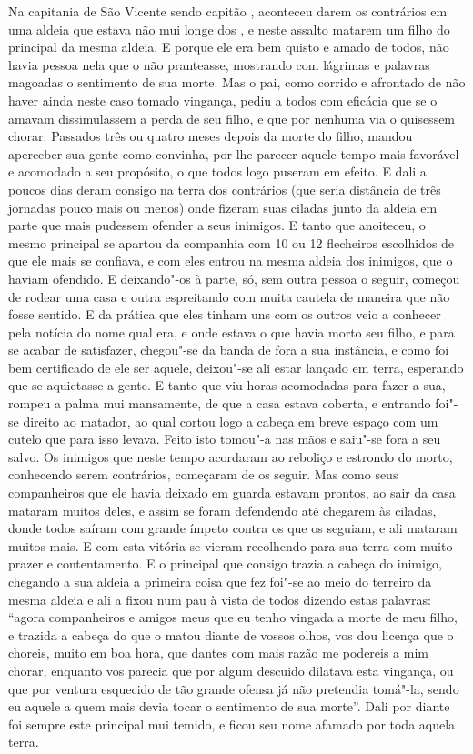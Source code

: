 Na capitania de São Vicente sendo capitão , aconteceu darem		%
os contrários em uma aldeia que estava não mui longe dos , e
neste assalto matarem um filho do principal da mesma aldeia. E porque
ele era bem quisto e amado de todos, não havia pessoa nela que o não
pranteasse, mostrando com lágrimas e palavras magoadas o sentimento de
sua morte. Mas o pai, como corrido e afrontado de não haver ainda neste
caso tomado vingança, pediu a todos com eficácia que se o amavam
dissimulassem a perda de seu filho, e que por nenhuma  via o 
quisessem chorar. Passados três ou quatro meses depois da morte do
filho, mandou aperceber sua gente  como convinha, por lhe parecer
aquele tempo mais favorável e acomodado a seu propósito, o que todos
logo puseram em efeito. E dali a poucos dias deram consigo na terra dos
contrários (que seria distância de três jornadas pouco mais ou menos)
onde fizeram suas ciladas junto da aldeia em parte que mais pudessem
ofender a seus inimigos. E tanto que anoiteceu, o mesmo principal se
apartou da companhia com 10 ou 12 flecheiros escolhidos de que ele
mais se confiava, e com eles entrou na mesma aldeia dos inimigos, que o			%
haviam ofendido. E deixando"-os à parte, só, sem outra pessoa o seguir,
começou de rodear uma casa e outra espreitando com muita cautela de
maneira que não fosse sentido. E da prática que eles tinham uns com os
outros veio a conhecer pela notícia do nome qual era, e onde estava o
que havia morto seu filho, e para se acabar de satisfazer, chegou"-se da
banda de fora a sua instância, e como foi bem certificado de ele ser
aquele, deixou"-se ali estar lançado em terra, esperando que se
aquietasse a gente. E tanto que viu horas acomodadas para fazer a sua,
rompeu a palma mui mansamente, de que a casa estava coberta, e entrando
foi"-se direito ao matador, ao qual cortou logo a cabeça em breve espaço
com um cutelo que para isso levava. Feito isto tomou"-a nas mãos e
saiu"-se fora a seu salvo. Os inimigos que neste tempo acordaram ao
reboliço e estrondo do morto, conhecendo serem contrários, começaram de
os seguir. Mas como seus companheiros que ele havia deixado em guarda
estavam prontos, ao sair da casa mataram muitos deles, e assim se foram
defendendo até chegarem às ciladas, donde todos saíram com grande
ímpeto contra os que os seguiam, e ali mataram muitos mais. E com esta
vitória se vieram recolhendo para sua terra com muito prazer e
contentamento. E o principal que consigo trazia a cabeça do inimigo,
chegando a sua aldeia a primeira coisa que fez foi"-se ao meio do
terreiro da mesma aldeia e ali a fixou num pau à vista de todos dizendo
estas palavras: ``agora companheiros e amigos meus que eu tenho vingada a
morte de meu filho, e trazida a cabeça do que o matou diante de vossos
olhos, vos dou licença que o choreis, muito em boa hora, que dantes com mais
razão me podereis a mim chorar, enquanto vos parecia que por algum
descuido dilatava esta vingança, ou que por ventura esquecido de tão
grande ofensa já não pretendia tomá"-la, sendo eu aquele a quem mais
devia tocar o sentimento de sua morte''. Dali por diante foi sempre este
principal mui temido, e ficou seu nome afamado por toda aquela terra.

